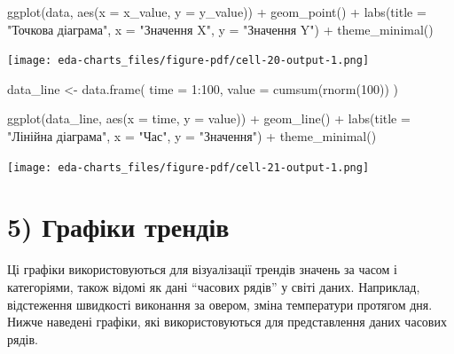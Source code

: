 \documentclass[
  letterpaper,
  DIV=11,
  numbers=noendperiod]{scrreprt}
\newenvironment{Shaded}{\begin{snugshade}}{\end{snugshade}}
\newcommand{\AttributeTok}[1]{\textcolor[rgb]{0.40,0.45,0.13}{#1}}
\newcommand{\DecValTok}[1]{\textcolor[rgb]{0.68,0.00,0.00}{#1}}
\newcommand{\FunctionTok}[1]{\textcolor[rgb]{0.28,0.35,0.67}{#1}}
\newcommand{\NormalTok}[1]{\textcolor[rgb]{0.00,0.23,0.31}{#1}}
\newcommand{\OtherTok}[1]{\textcolor[rgb]{0.00,0.23,0.31}{#1}}
\newcommand{\SpecialCharTok}[1]{\textcolor[rgb]{0.37,0.37,0.37}{#1}}
\newcommand{\StringTok}[1]{\textcolor[rgb]{0.13,0.47,0.30}{#1}}
\begin{document}
\begin{Shaded}
\begin{Highlighting}[]
\FunctionTok{ggplot}\NormalTok{(data, }\FunctionTok{aes}\NormalTok{(}\AttributeTok{x =}\NormalTok{ x\_value, }\AttributeTok{y =}\NormalTok{ y\_value)) }\SpecialCharTok{+}
  \FunctionTok{geom\_point}\NormalTok{() }\SpecialCharTok{+}
  \FunctionTok{labs}\NormalTok{(}\AttributeTok{title =} \StringTok{"Точкова діаграма"}\NormalTok{, }\AttributeTok{x =} \StringTok{"Значення X"}\NormalTok{, }\AttributeTok{y =} \StringTok{"Значення Y"}\NormalTok{) }\SpecialCharTok{+}
  \FunctionTok{theme\_minimal}\NormalTok{()}
\end{Highlighting}
\end{Shaded}

\texttt{[image: eda-charts\_files/figure-pdf/cell-20-output-1.png]}

\begin{Shaded}
\begin{Highlighting}[]
\NormalTok{data\_line }\OtherTok{\textless{}{-}} \FunctionTok{data.frame}\NormalTok{(}
  \AttributeTok{time =} \DecValTok{1}\SpecialCharTok{:}\DecValTok{100}\NormalTok{,}
  \AttributeTok{value =} \FunctionTok{cumsum}\NormalTok{(}\FunctionTok{rnorm}\NormalTok{(}\DecValTok{100}\NormalTok{))}
\NormalTok{)}

\FunctionTok{ggplot}\NormalTok{(data\_line, }\FunctionTok{aes}\NormalTok{(}\AttributeTok{x =}\NormalTok{ time, }\AttributeTok{y =}\NormalTok{ value)) }\SpecialCharTok{+}
  \FunctionTok{geom\_line}\NormalTok{() }\SpecialCharTok{+}
  \FunctionTok{labs}\NormalTok{(}\AttributeTok{title =} \StringTok{"Лінійна діаграма"}\NormalTok{, }\AttributeTok{x =} \StringTok{"Час"}\NormalTok{, }\AttributeTok{y =} \StringTok{"Значення"}\NormalTok{) }\SpecialCharTok{+}
  \FunctionTok{theme\_minimal}\NormalTok{()}
\end{Highlighting}
\end{Shaded}

\texttt{[image: eda-charts\_files/figure-pdf/cell-21-output-1.png]}

\chapter{5) Графіки
трендів}\label{ux433ux440ux430ux444ux456ux43aux438-ux442ux440ux435ux43dux434ux456ux432}

Ці графіки використовуються для візуалізації трендів значень за часом і
категоріями, також відомі як дані ``часових рядів'' у світі даних.
Наприклад, відстеження швидкості виконання за овером, зміна температури
протягом дня. Нижче наведені графіки, які використовуються для
представлення даних часових рядів.
\end{document}
